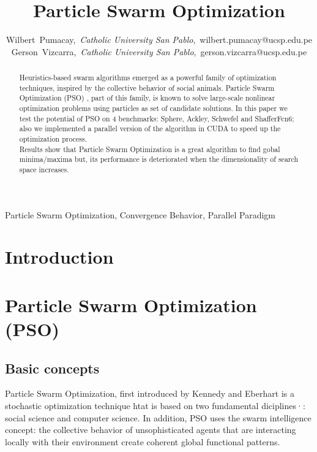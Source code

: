 \documentclass[journal]{IEEEtran}
\begin{document}
\title{Particle Swarm Optimization}

\author{Wilbert~Pumacay,~\textit{Catholic University San Pablo},~wilbert.pumacay@ucsp.edu.pe\\
        Gerson~Vizcarra,~\textit{Catholic University San Pablo},~gerson.vizcarra@ucsp.edu.pe}

\maketitle

\begin{abstract}
Heuristics-based swarm algorithms emerged as a powerful family of optimization techniques, inspired by the collective behavior of social animals. Particle Swarm Optimization (PSO) , part of this family, is known to solve large-scale nonlinear optimization problems using particles as set of candidate solutions. In this paper we test the potential of PSO on 4 benchmarks: Sphere, Ackley, Schwefel and ShafferFcn6; also we implemented a parallel version of the algorithm in CUDA to speed up the optimization process.
\\
Results show that Particle Swarm Optimization is a great algorithm to find gobal minima/maxima but, its performance is deteriorated when the dimensionality of search space increases.
\end{abstract}

\begin{IEEEkeywords}
Particle Swarm Optimization, Convergence Behavior, Parallel Paradigm
\end{IEEEkeywords}


\section{Introduction}



\section{ Particle Swarm Optimization (PSO) }
\subsection{Basic concepts}
Particle Swarm Optimization, first introduced by Kennedy and Eberhart \cite{Kennedy1995} is a stochastic optimization technique htat is based on two fundamental diciplines·\cite{delValle2008}: social science and computer science. In addition, PSO uses the swarm intelligence concept: the collective behavior of unsophisticated agents that are interacting locally with their environment create coherent global functional patterns.
\end{document}

